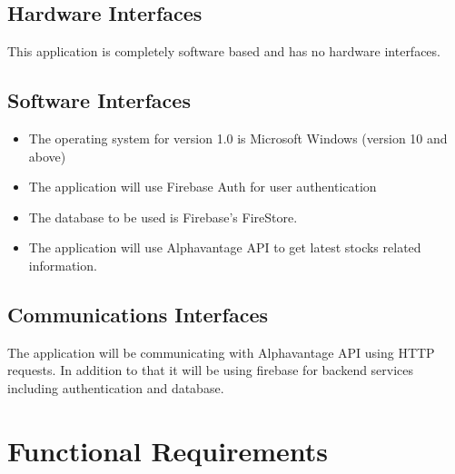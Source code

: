\documentclass[12 pt, a4paper]{report}
\begin{document}
	\subsection {Hardware Interfaces}
	This application is completely software based and has no hardware interfaces.
	
	\subsection {Software Interfaces}

	\begin{itemize}
		\item The operating system for version 1.0 is Microsoft Windows (version 10 and above)
		\item The application will use Firebase Auth for user authentication
		\item The database to be used is Firebase's FireStore.
		\item The application will use Alphavantage API to get latest stocks related information.
	\end{itemize}
	
	\subsection {Communications Interfaces}

	The application will be communicating with Alphavantage API using HTTP requests. In addition to that it will be using firebase for backend services including authentication and database.
	
	\section {Functional Requirements}
	
\end{document}

